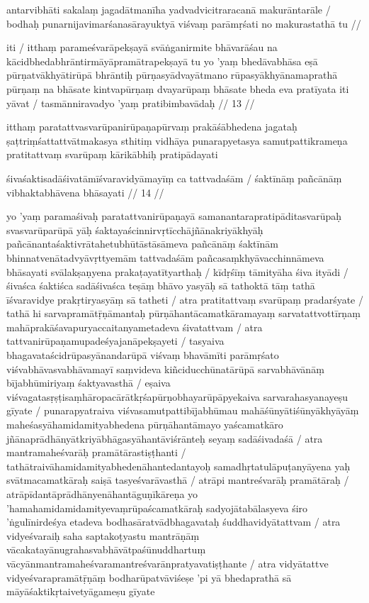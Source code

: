 antarvibhāti sakalaṃ jagadātmanīha yadvadvicitraracanā makurāntarāle  /
bodhaḥ punarnijavimarśanasārayuktyā viśvaṃ parāmṛśati no makurastathā tu  //

iti  / itthaṃ parameśvarāpekṣayā svāṅganirmite bhāvarāśau na kācidbhedabhrāntirmāyāpramātrapekṣayā tu yo 'yaṃ bhedāvabhāsa eṣā pūrṇatvākhyātirūpā bhrāntiḥ pūrṇasyādvayātmano rūpasyākhyānamaprathā pūrṇaṃ na bhāsate kintvapūrṇaṃ dvayarūpaṃ bhāsate bheda eva pratīyata iti yāvat  / tasmānniravadyo 'yaṃ pratibimbavādaḥ  // 13  //

itthaṃ paratattvasvarūpanirūpaṇapūrvaṃ prakāśābhedena jagataḥ ṣaṭtriṃśattattvātmakasya sthitiṃ vidhāya punarapyetasya samutpattikrameṇa pratitattvaṃ svarūpaṃ kārikābhiḥ pratipādayati

śivaśaktisadāśivatāmīśvaravidyāmayīṃ ca tattvadaśām  /
śaktīnāṃ pañcānāṃ vibhaktabhāvena bhāsayati  // 14  //

yo 'yaṃ paramaśivaḥ paratattvanirūpaṇayā samanantarapratipāditasvarūpaḥ svasvarūparūpā yāḥ śaktayaścinnirvṛtīcchājñānakriyākhyāḥ pañcānantaśaktivrātahetubhūtāstāsāmeva pañcānāṃ śaktīnām bhinnatvenātadvyāvṛttyemām tattvadaśām pañcasaṃkhyāvacchinnāmeva bhāsayati svālakṣaṇyena prakaṭayatītyarthaḥ  / kīdṛśīṃ tāmityāha śiva ityādi  / śivaśca śaktiśca sadāśivaśca teṣāṃ bhāvo yasyāḥ sā tathoktā tāṃ tathā īśvaravidye prakṛtiryasyāṃ sā tatheti  / atra pratitattvaṃ svarūpaṃ pradarśyate  / tathā hi sarvapramātṝṇāmantaḥ pūrṇāhantācamatkāramayaṃ sarvatattvottīrṇaṃ mahāprakāśavapuryaccaitanyametadeva śivatattvam  / atra tattvanirūpaṇamupadeśyajanāpekṣayeti  / tasyaiva bhagavataścidrūpasyānandarūpā viśvaṃ bhavāmīti parāmṛśato viśvabhāvasvabhāvamayī saṃvideva kiñciducchūnatārūpā sarvabhāvānāṃ bījabhūmiriyaṃ śaktyavasthā  / eṣaiva viśvagatasṛṣṭisaṃhāropacārātkṛśapūrṇobhayarūpāpyekaiva sarvarahasyanayeṣu gīyate  / punarapyatraiva viśvasamutpattibījabhūmau mahāśūnyātiśūnyākhyāyāṃ maheśasyāhamidamityabhedena pūrṇāhantāmayo yaścamatkāro jñānaprādhānyātkriyābhāgasyāhantāviśrānteḥ seyaṃ sadāśivadaśā  / atra mantramaheśvarāḥ pramātārastiṣṭhanti  / tathātraivāhamidamityabhedenāhantedantayoḥ samadhṛtatulāpuṭanyāyena yaḥ svātmacamatkāraḥ saiṣā tasyeśvarāvasthā  / atrāpi mantreśvarāḥ pramātāraḥ  / atrāpīdantāprādhānyenāhantāguṇīkāreṇa yo 'hamahamidamidamityevaṃrūpaścamatkāraḥ sadyojātabālasyeva śiro 'ṅgulīnirdeśya etadeva bodhasāratvādbhagavataḥ śuddhavidyātattvam  / atra vidyeśvaraiḥ saha saptakoṭyastu mantrāṇāṃ vācakatayānugrahasvabhāvātpaśūnuddhartuṃ vācyānmantramaheśvaramantreśvarānpratyavatiṣṭhante  / atra vidyātattve vidyeśvarapramātṝṇāṃ bodharūpatvāviśeṣe 'pi yā bhedaprathā sā māyāśaktikṛtaivetyāgameṣu gīyate

